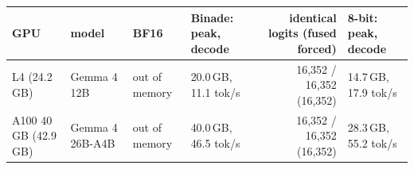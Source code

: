 \begin{tabular}{llllrl}
\toprule
GPU & model & BF16 & Binade: peak, decode & identical logits (fused forced) & 8-bit: peak, decode \\
\midrule
L4 (24.2\,GB) & Gemma 4 12B & out of memory & 20.0\,GB, 11.1 tok/s & 16,352 / 16,352 (16,352) & 14.7\,GB, 17.9 tok/s \\
A100 40\,GB (42.9\,GB) & Gemma 4 26B-A4B & out of memory & 40.0\,GB, 46.5 tok/s & 16,352 / 16,352 (16,352) & 28.3\,GB, 55.2 tok/s \\
\bottomrule
\end{tabular}
